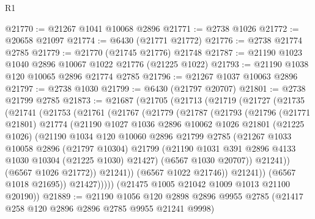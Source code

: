 \begin{lexlean}{R1}
\begin{coremodule}
@21770 := @21267 @1041 @10068 @2896
@21771 := @2738 @1026
@21772 := @20658 @21097
@21774 := @6430 (@21771 @21772)
@21776 := @2738 @21774 @2785
@21779 := @21770 (@21745 @21776) @21748
@21787 := @21190 @1023 @1040 @2896 @10067 @1022 @21776 (@21225 @1022)
@21793 := @21190 @1038 @120 @10065 @2896 @21774 @2785
@21796 := @21267 @1037 @10063 @2896
@21797 := @2738 @1030
@21799 := @6430 (@21797 @20707)
@21801 := @2738 @21799 @2785
@21873 := @21687
    (@21705
      (@21713
        (@21719
          (@21727
            (@21735
              (@21741
                (@21753
                  (@21761
                    (@21767
                      (@21779
                        (@21787
                          (@21793
                            (@21796
                              (@21771 @21801)
                              @21774
                              (@21190
                                @1027
                                @1036
                                @2896
                                @10062
                                @1026
                                @21801
                                (@21225 @1026)
                                (@21190
                                  @1034
                                  @120
                                  @10060
                                  @2896
                                  @21799
                                  @2785
                                  (@21267
                                    @1033
                                    @10058
                                    @2896
                                    (@21797 @10304)
                                    @21799
                                    (@21190
                                      @1031
                                      @391
                                      @2896
                                      @4133
                                      @1030
                                      @10304
                                      (@21225 @1030)
                                      @21427)
                                    (@6567 @1030 @20707))
                                  @21241))
                              (@6567 @1026 @21772))
                            @21241))
                        (@6567 @1022 @21746))
                      @21241))
                  (@6567 @1018 @21695))
                @21427)))))
      (@21475 @1005 @21042 @1009 @1013 @21100 @20190))
@21889 := @21190
    @1056
    @120
    @2898
    @2896
    @9955
    @2785
    (@21417 @258 @120 @2896 @2896 @2785 @9955 @21241 @9998)

\end{coremodule}
\end{lexlean}
